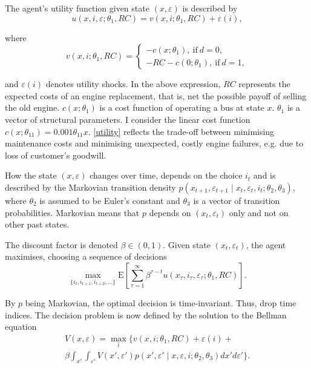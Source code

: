 The agent’s utility function given state $(x, \varepsilon)$ is described by
\begin{equation}
u(x, i, \varepsilon; \theta_1, RC)=v(x, i; \theta_1, RC)+\varepsilon(i), \label{utility}
\end{equation}

where
\begin{equation*}
v(x, i; \theta_1, RC)=
\begin{cases}
-c(x; \theta_1),\ \text{if}\ d=0,\\
-RC-c(0;\theta_1),\ \text{if}\ d=1,
\end{cases}
\end{equation*}

\noindent and $\varepsilon(i)$ denotes utility shocks. In the above expression, $RC$ represents the expected costs of an engine replacement, that is, net the possible payoff of selling the old engine. $c(x; \theta_1)$ is a cost function of operating a bus at state $x$. $\theta_1$ is a vector of structural parameters. I consider the linear cost function $c(x; \theta_{11}) = 0.001 \theta_{11} x$.
\cref{utility} reflects the trade-off between minimising maintenance costs and minimising unexpected, costly engine failures, e.g. due to loss of customer's goodwill.

How the state $(x, \varepsilon)$ changes over time, depends on the choice $i_t$ and is described by the Markovian transition density $p(x_{t+1}, \varepsilon_{t+1} \mid x_t, \varepsilon_t, i_t; \theta_2, \theta_3)$, where $\theta_2$ is assumed to be Euler’s constant and $\theta_3$ is a vector of transition probabilities. Markovian means that $p$ depends on $ (x_t, \varepsilon_t) $ only and not on other past states.

The discount factor is denoted $\beta \in (0,1) $. Given state $ (x_t, \varepsilon_t) $, the agent maximises, choosing a sequence of decisions
\begin{equation*}
\max_{\{i_t, i_{t+1}, i_{t+2}, \dots\}}  \mathrm{E} \left[\sum_{\tau=1}^\infty \beta^{\tau-t} u(x_{\tau}, i_{\tau}, \varepsilon_{\tau}; \theta_1, RC) \right].
\end{equation*}

By $p$ being Markovian, the optimal decision is time-invariant. Thus, drop time indices. The decision problem is now defined by the solution to the Bellman equation
\begin{multline*}
V(x, \varepsilon)=\max_i \{ v(x, i; \theta_1, RC)+\varepsilon(i) + \\
\beta \int_{x'} \int_{\varepsilon'} V(x', \varepsilon')p(x', \varepsilon' \mid x, \varepsilon, i; \theta_2, \theta_3)dx' d \varepsilon' \}.
\end{multline*}

